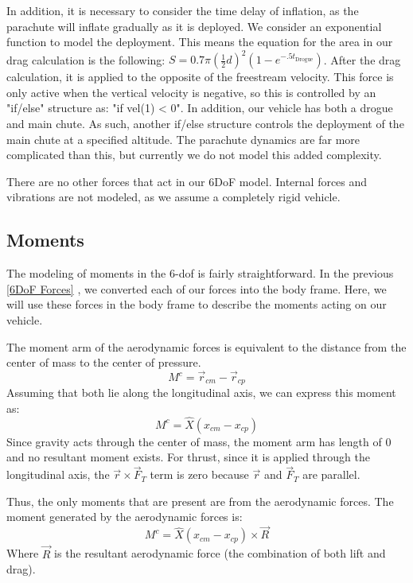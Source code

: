 \documentclass[10pt, openany, titlepage]{book}
\theoremstyle{definition}
\let\oldautoref\autoref
\renewcommand{\autoref}[1]{%
  \begingroup
  \hypersetup{linkcolor=black}%
  \oldautoref{#1}%
  \endgroup
}
\begin{document}
In addition, it is necessary to consider the time delay of inflation, as the parachute will inflate gradually as it is deployed. We consider an exponential function to model the deployment. This means the equation for the area in our drag calculation is the following: $S=0.7\pi (\frac{1}{2}d)^2(1-e^{-.5t_{\text{Drogue}}})$. After the drag calculation, it is applied to the opposite of the freestream velocity. This force is only active when the vertical velocity is negative, so this is controlled by an "if/else" structure as: "if vel(1) < 0". In addition, our vehicle has both a drogue and main chute. As such, another if/else structure controls the deployment of the main chute at a specified altitude. The parachute dynamics are far more complicated than this, but currently we do not model this added complexity. 

There are no other forces that act in our 6DoF model. Internal forces and vibrations are not modeled, as we assume a completely rigid vehicle.
\subsection{Moments}
The modeling of moments in the 6-\gls{dof} is fairly straightforward. In the previous \autoref{6DoF Forces}, we converted each of our forces into the \gls{body frame}. Here, we will use these forces in the \gls{body frame} to describe the moments acting on our vehicle. 

The moment arm of the aerodynamic forces is equivalent to the distance from the center of mass to the center of pressure. 
\begin{equation}
    M^c=\vec{r}_{cm}-\vec{r}_{cp}
\end{equation}
Assuming that both lie along the longitudinal axis, we can express this moment as:
\begin{equation}
    M^c=\hat{X}(x_{cm}-x_{cp})
\end{equation}
Since gravity acts through the center of mass, the moment arm has length of 0 and no resultant moment exists. For thrust, since it is applied through the longitudinal axis, the $\vec{r}\times \vec{F}_T$ term is zero because $\vec{r}$ and $\vec{F}_T$ are parallel.

Thus, the only moments that are present are from the aerodynamic forces. The moment generated by the aerodynamic forces is:
\begin{equation}
    M^c=\hat{X}(x_{cm}-x_{cp})\times \vec{R}
\end{equation}
Where $\vec{R}$ is the resultant aerodynamic force (the combination of both lift and drag).
\end{document}
